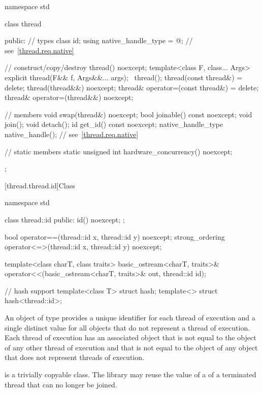%
\begin{codeblock}
namespace std {
  class thread {
  public:
    // types
    class id;
    using native_handle_type = @\impdefnc@;         // see~\ref{thread.req.native}

    // construct/copy/destroy
    thread() noexcept;
    template<class F, class... Args> explicit thread(F&& f, Args&&... args);
    ~thread();
    thread(const thread&) = delete;
    thread(thread&&) noexcept;
    thread& operator=(const thread&) = delete;
    thread& operator=(thread&&) noexcept;

    // members
    void swap(thread&) noexcept;
    bool joinable() const noexcept;
    void join();
    void detach();
    id get_id() const noexcept;
    native_handle_type native_handle();                         // see~\ref{thread.req.native}

    // static members
    static unsigned int hardware_concurrency() noexcept;
  };
}
\end{codeblock}

[thread.thread.id]{Class }

%
%
\begin{codeblock}
namespace std {
  class thread::id {
  public:
    id() noexcept;
  };

  bool operator==(thread::id x, thread::id y) noexcept;
  strong_ordering operator<=>(thread::id x, thread::id y) noexcept;

  template<class charT, class traits>
    basic_ostream<charT, traits>&
      operator<<(basic_ostream<charT, traits>& out, thread::id id);

  // hash support
  template<class T> struct hash;
  template<> struct hash<thread::id>;
}
\end{codeblock}

\pnum
An object of type  provides a unique identifier for
each thread of execution and a single distinct value for all 
objects that do not represent a thread of
execution. Each thread of execution has an
associated  object that is not equal to the
 object of any other thread of execution and that is not
equal to the  object of any  object that
does not represent threads of execution.

\pnum
{} is a trivially copyable class.
The library may reuse the value of a  of a terminated thread that can no longer be joined.

